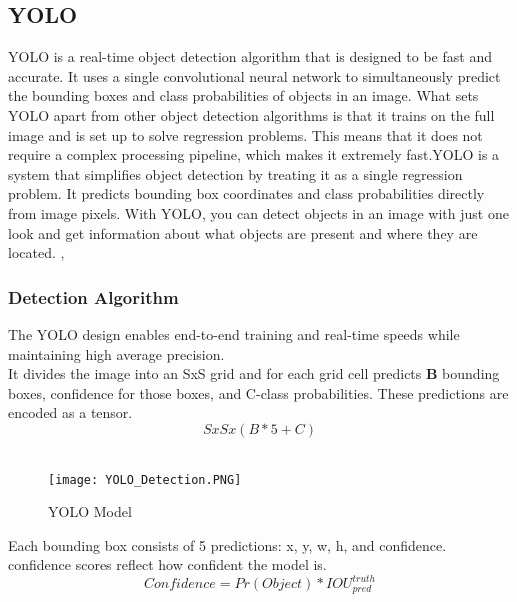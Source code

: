 \subsection{YOLO}
YOLO is a real-time object detection algorithm that is designed to be fast and accurate. It uses a single convolutional neural network to simultaneously predict the bounding boxes and class probabilities of objects in an image. What sets YOLO apart from other object detection algorithms is that it trains on the full image and is set up to solve regression problems. This means that it does not require a complex processing pipeline, which makes it extremely fast.YOLO is a system that simplifies object detection by treating it as a single regression problem. It predicts bounding box coordinates and class probabilities directly from image pixels. With YOLO, you can detect objects in an image with just one look and get information about what objects are present and where they are located. \cite{redmon2016you}, \cite{ansari2020building}

\subsubsection{Detection Algorithm}
The YOLO design enables end-to-end training and real-time speeds while maintaining high average precision. \\
It divides the image into an SxS grid and for each
grid cell predicts \textbf{B} bounding boxes, confidence for those boxes,
and C-class probabilities. These predictions are encoded as a tensor.
\[
S x S x (B*5 + C)
\]
\\
\begin{figure}[H]
    \centering
    \texttt{[image: YOLO\_Detection.PNG]}
    \caption{YOLO Model}
    \label{fig:YoloV1_Model}
\end{figure}

Each bounding box consists of 5 predictions: x, y, w, h,
and confidence. confidence scores reflect how confident the model is.
\[
Confidence =Pr(Object)*IOU_{pred}^{truth}
\]

